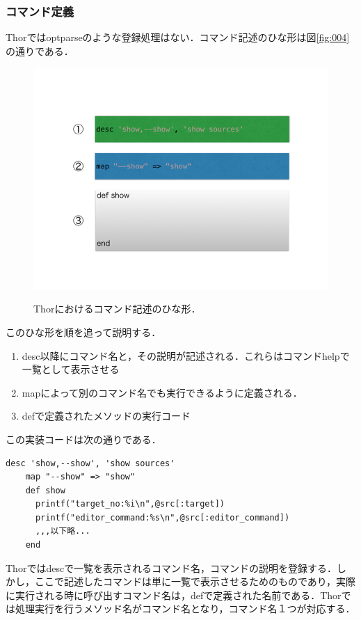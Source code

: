\subsubsection{コマンド定義}
Thorではoptparseのような登録処理はない．コマンド記述のひな形は図\ref{fig:004}の通りである．

\begin{figure}[htbp]\begin{center}
\includegraphics[width=12cm,bb= 0 0 737 553]{../figs/./hikiutils_yamane.004.jpg}
\caption{Thorにおけるコマンド記述のひな形．}
\label{fig:004}
\label{default}\end{center}\end{figure}
このひな形を順を追って説明する．

\begin{enumerate}
\item desc以降にコマンド名と，その説明が記述される．これらはコマンドhelpで一覧として表示させる
\item mapによって別のコマンド名でも実行できるように定義される．
\item defで定義されたメソッドの実行コード
\end{enumerate}
この実装コードは次の通りである．
\begin{lstlisting}[style=customRuby,basicstyle={\scriptsize\ttfamily}]
    desc 'show,--show', 'show sources'
    map "--show" => "show"
    def show
      printf("target_no:%i\n",@src[:target])
      printf("editor_command:%s\n",@src[:editor_command])
      ,,,以下略...
    end
\end{lstlisting}
Thorではdescで一覧を表示されるコマンド名，コマンドの説明を登録する．しかし，ここで記述したコマンドは単に一覧で表示させるためのものであり，実際に実行される時に呼び出すコマンド名は，defで定義された名前である．Thorでは処理実行を行うメソッド名がコマンド名となり，コマンド名１つが対応する．

